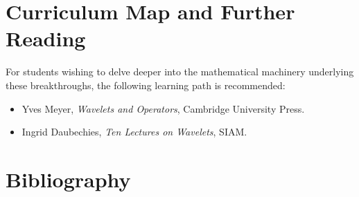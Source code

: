 \section{Curriculum Map and Further Reading}
For students wishing to delve deeper into the mathematical machinery underlying these breakthroughs, the following learning path is recommended:
\begin{itemize}
  \item Yves Meyer, \emph{Wavelets and Operators}, Cambridge University Press.
  \item Ingrid Daubechies, \emph{Ten Lectures on Wavelets}, SIAM.
\end{itemize}

\section*{Bibliography}
